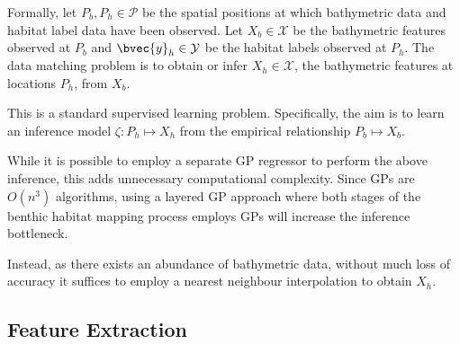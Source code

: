 			Formally, let $P_{b}, P_{h} \in \mathcal{P}$ be the spatial positions at which bathymetric data and habitat label data have been observed. Let $X_{b} \in \mathcal{X}$ be the bathymetric features observed at $P_{b}$ and $\bvec{y}_{h} \in \mathcal{Y}$ be the habitat labels observed at $P_{h}$. The data matching problem is to obtain or infer $X_{h} \in \mathcal{X}$, the bathymetric features at locations $P_{h}$, from $X_{b}$.
			
			This is a standard supervised learning problem. Specifically, the aim is to learn an inference model $\zeta: P_{h} \mapsto X_{h}$ from the empirical relationship $P_{b} \mapsto X_{b}$.
			
			While it is possible to employ a separate GP regressor to perform the above inference, this adds unnecessary computational complexity. Since GPs are $O(n^{3})$ algorithms, using a layered GP approach where both stages of the benthic habitat mapping process employs GPs will increase the inference bottleneck.
			
			Instead, as there exists an abundance of bathymetric data, without much loss of accuracy it suffices to employ a nearest neighbour interpolation to obtain $X_{h}$. 
			
%			
%			
			
			\FloatBarrier
	
		\subsection{Feature Extraction}
		\label{BenthicHabitatMapping:BathymetricFeatures:FeatureExtraction}
		

